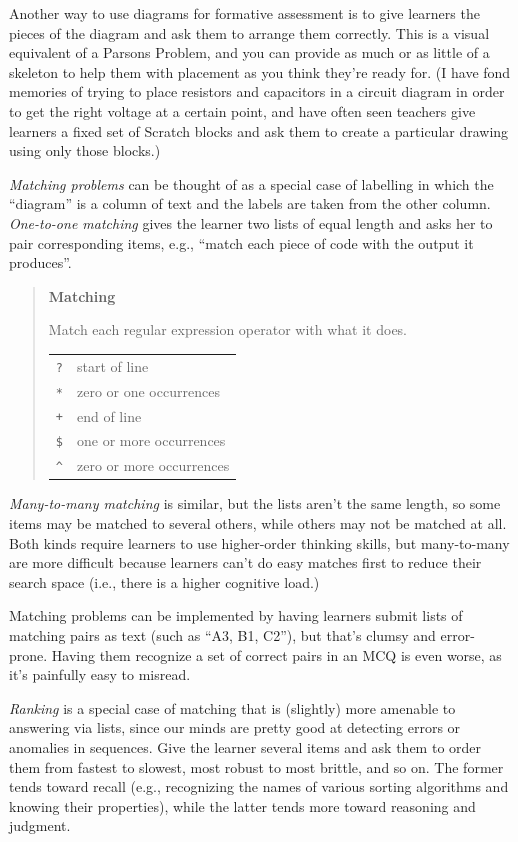 Another way to use diagrams for formative assessment is to give learners
the pieces of the diagram and ask them to arrange them correctly. This
is a visual equivalent of a Parsons Problem, and you can provide as much
or as little of a skeleton to help them with placement as you think
they're ready for. (I have fond memories of trying to place resistors
and capacitors in a circuit diagram in order to get the right voltage at
a certain point, and have often seen teachers give learners a fixed set
of Scratch blocks and ask them to create a particular drawing using only
those blocks.)

\emph{Matching problems} can be thought of as a special case of labelling in
which the ``diagram'' is a column of text and the labels are taken from
the other column. \emph{One-to-one matching} gives the learner two lists of
equal length and asks her to pair corresponding items, e.g., ``match each
piece of code with the output it produces''.

\begin{quote}\setlength{\parindent}{0pt}
\textbf{Matching}

Match each regular expression operator with what it does.

\begin{longtable}[]{@{}ll@{}}
\texttt{?} & start of line\tabularnewline
\texttt{*} & zero or one occurrences\tabularnewline
\texttt{+} & end of line\tabularnewline
\texttt{\$} & one or more occurrences\tabularnewline
\texttt{\^{}} & zero or more occurrences\tabularnewline
\end{longtable}
\end{quote}

\emph{Many-to-many matching} is similar, but the lists aren't the same
length, so some items may be matched to several others, while others may
not be matched at all. Both kinds require learners to use higher-order
thinking skills, but many-to-many are more difficult because learners
can't do easy matches first to reduce their search space (i.e., there is
a higher cognitive load.)

Matching problems can be implemented by having learners submit lists of
matching pairs as text (such as ``A3, B1, C2''), but that's clumsy and
error-prone. Having them recognize a set of correct pairs in an MCQ is
even worse, as it's painfully easy to misread.

\emph{Ranking} is a special case of matching that is (slightly) more amenable
to answering via lists, since our minds are pretty good at detecting
errors or anomalies in sequences. Give the learner several items and ask
them to order them from fastest to slowest, most robust to most brittle,
and so on. The former tends toward recall (e.g., recognizing the names
of various sorting algorithms and knowing their properties), while the
latter tends more toward reasoning and judgment.

